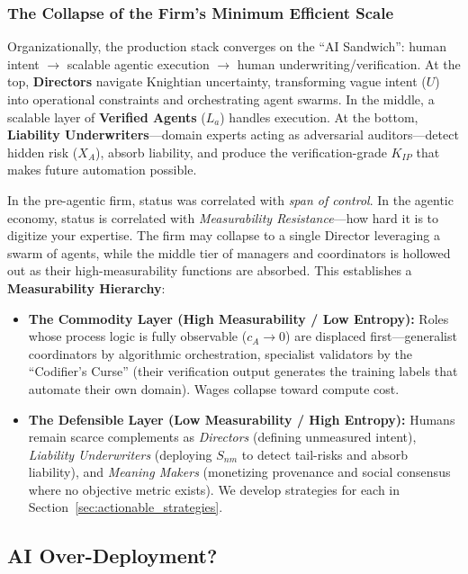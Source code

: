 \documentclass[12pt, letter]{article}
\begin{document}
\subsubsection{The Collapse of the Firm's Minimum Efficient Scale}
Organizationally, the production stack converges on the ``AI Sandwich'': human intent $\rightarrow$ scalable agentic execution $\rightarrow$ human underwriting/verification. At the top, \textbf{Directors} navigate Knightian uncertainty, transforming vague intent ($U$) into operational constraints and orchestrating agent swarms. In the middle, a scalable layer of \textbf{Verified Agents} ($L_a$) handles execution. At the bottom, \textbf{Liability Underwriters}---domain experts acting as adversarial auditors---detect hidden risk ($X_A$), absorb liability, and produce the verification-grade $K_{IP}$ that makes future automation possible.

In the pre-agentic firm, status was correlated with \textit{span of control}. In the agentic economy, status is correlated with \textit{Measurability Resistance}---how hard it is to digitize your expertise. The firm may collapse to a single Director leveraging a swarm of agents, while the middle tier of managers and coordinators is hollowed out as their high-measurability functions are absorbed. This establishes a \textbf{Measurability Hierarchy}:
\begin{itemize}
    \item \textbf{The Commodity Layer (High Measurability / Low Entropy):} Roles whose process logic is fully observable ($c_A \to 0$) are displaced first---generalist coordinators by algorithmic orchestration, specialist validators by the ``Codifier's Curse'' (their verification output generates the training labels that automate their own domain). Wages collapse toward compute cost.
    \item \textbf{The Defensible Layer (Low Measurability / High Entropy):} Humans remain scarce complements as \textit{Directors} (defining unmeasured intent), \textit{Liability Underwriters} (deploying $S_{nm}$ to detect tail-risks and absorb liability), and \textit{Meaning Makers} (monetizing provenance and social consensus where no objective metric exists). We develop strategies for each in Section~\ref{sec:actionable_strategies}.
\end{itemize}





\subsection{AI Over-Deployment?}\label{subsec:over_deployment}
\end{document}
